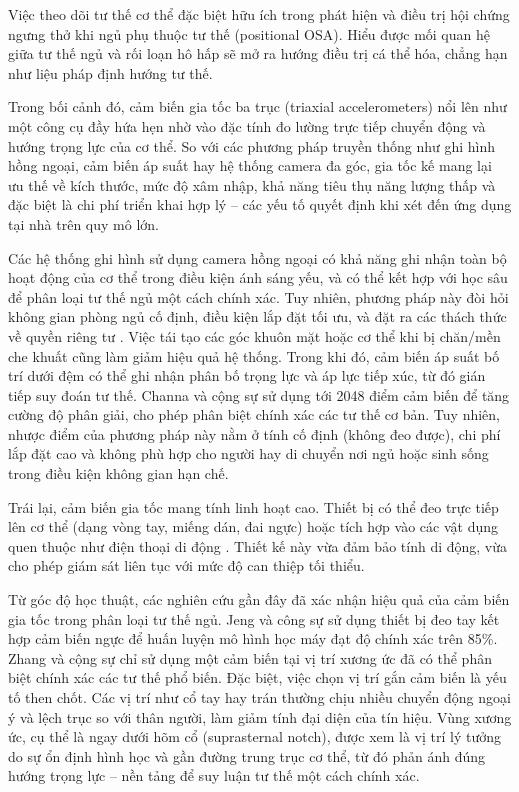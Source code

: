 Việc theo dõi tư thế cơ thể đặc biệt hữu ích trong phát hiện và điều trị hội
chứng ngưng thở khi ngủ phụ thuộc tư thế (positional OSA). Hiểu được mối quan
hệ giữa tư thế ngủ và rối loạn hô hấp sẽ mở ra hướng điều trị cá thể hóa, chẳng
hạn như liệu pháp định hướng tư thế.

Trong bối cảnh đó, cảm biến gia tốc ba trục (triaxial accelerometers) nổi lên
như một công cụ đầy hứa hẹn nhờ vào đặc tính đo lường trực tiếp chuyển động và
hướng trọng lực của cơ thể. So với các phương pháp truyền thống như ghi hình
hồng ngoại, cảm biến áp suất hay hệ thống camera đa góc, gia tốc kế mang lại ưu
thế về kích thước, mức độ xâm nhập, khả năng tiêu thụ năng lượng thấp và đặc
biệt là chi phí triển khai hợp lý – các yếu tố quyết định khi xét đến ứng dụng
tại nhà trên quy mô lớn.

Các hệ thống ghi hình sử dụng camera hồng ngoại có khả năng ghi nhận toàn bộ
hoạt động của cơ thể trong điều kiện ánh sáng yếu, và có thể kết hợp với học
sâu để phân loại tư thế ngủ một cách chính xác. Tuy nhiên, phương pháp này đòi
hỏi không gian phòng ngủ cố định, điều kiện lắp đặt tối ưu, và đặt ra các thách
thức về quyền riêng tư \cite{Akbarian_osa}. Việc tái tạo các góc khuôn mặt hoặc
cơ thể khi bị chăn/mền che khuất cũng làm giảm hiệu quả hệ thống. Trong khi đó,
cảm biến áp suất bố trí dưới đệm có thể ghi nhận phân bố trọng lực và áp lực
tiếp xúc, từ đó gián tiếp suy đoán tư thế. Channa và cộng sự \cite{Channa_osa}
sử dụng tới 2048 điểm cảm biến để tăng cường độ phân giải, cho phép phân biệt
chính xác các tư thế cơ bản. Tuy nhiên, nhược điểm của phương pháp này nằm ở
tính cố định (không đeo được), chi phí lắp đặt cao và không phù hợp cho người
hay di chuyển nơi ngủ hoặc sinh sống trong điều kiện không gian hạn chế.

Trái lại, cảm biến gia tốc mang tính linh hoạt cao. Thiết bị có thể đeo trực
tiếp lên cơ thể (dạng vòng tay, miếng dán, đai ngực) hoặc tích hợp vào các vật
dụng quen thuộc như điện thoại di động \cite{sun2017sleepmonitor, Natale_osa}.
Thiết kế này vừa đảm bảo tính di động, vừa cho phép giám sát liên tục với mức
độ can thiệp tối thiểu.

Từ góc độ học thuật, các nghiên cứu gần đây đã xác nhận hiệu quả của cảm biến
gia tốc trong phân loại tư thế ngủ. Jeng và công sự \cite{Jeng} sử dụng thiết
bị đeo tay kết hợp cảm biến ngực để huấn luyện mô hình học máy đạt độ chính xác
trên 85\%. Zhang và cộng sự \cite{Zhang_osa} chỉ sử dụng một cảm biến tại vị
trí xương ức đã có thể phân biệt chính xác các tư thế phổ biến. Đặc biệt, việc
chọn vị trí gắn cảm biến là yếu tố then chốt. Các vị trí như cổ tay hay trán
thường chịu nhiều chuyển động ngoại ý và lệch trục so với thân người, làm giảm
tính đại diện của tín hiệu. Vùng xương ức, cụ thể là ngay dưới hõm cổ
(suprasternal notch), được xem là vị trí lý tưởng do sự ổn định hình học và gần
đường trung trục cơ thể, từ đó phản ánh đúng hướng trọng lực – nền tảng để suy
luận tư thế một cách chính xác.

